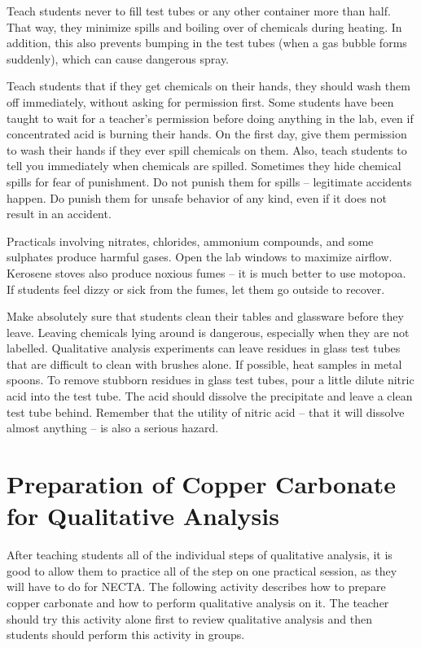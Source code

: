 Teach students never to fill test tubes or any other container more than half. That way, 
they minimize spills and boiling over of chemicals during heating. In addition, this also prevents bumping in the test tubes (when a gas bubble forms suddenly), which can cause dangerous spray.

Teach students that if they get chemicals on their hands, they should wash them off immediately, without asking for permission first. Some students have been taught to wait for a teacher's permission before doing anything in the lab, even if concentrated acid is burning their hands. On the first day, give them permission to wash their hands if they ever spill chemicals on them. Also, teach students to tell you immediately when chemicals are spilled. 
Sometimes they hide chemical spills for fear of punishment. Do not punish them for spills -- legitimate accidents happen. Do punish them for unsafe behavior of any kind, even if it does not result in an accident. 

Practicals involving nitrates, chlorides, ammonium compounds, and some sulphates produce harmful gases. Open the lab windows to maximize airflow. Kerosene stoves also produce noxious fumes -- it is much better to use motopoa. If students feel dizzy or sick from the fumes, let them go outside to recover.

Make absolutely sure that students clean their tables and glassware before they leave. Leaving chemicals lying around is dangerous, especially when they are not labelled. Qualitative analysis experiments can leave residues in glass test tubes that are difficult to clean with brushes alone. If possible, heat samples in metal spoons. To remove stubborn residues in glass test tubes, pour a little dilute nitric acid into the test tube. The acid should dissolve the precipitate and leave a clean test tube behind. Remember that the utility of nitric acid -- 
that it will dissolve almost anything -- is also a serious hazard.

\section{Preparation of Copper Carbonate for Qualitative Analysis}

After teaching students all of the individual steps of qualitative analysis, it is good to allow them to practice all of the step on one practical session, as they will have to do for NECTA. The following activity describes how to prepare copper carbonate and how to perform qualitative analysis on it. The teacher should try this activity alone first to review qualitative analysis and then students should perform this activity in groups.


